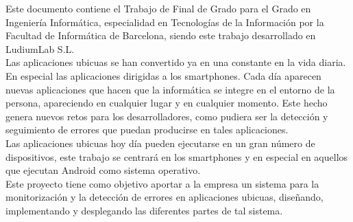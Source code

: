 
\renewenvironment{abstract}
{\small
	\begin{center}
		\bfseries \abstractname\vspace{-.5em}\vspace{0pt}
	\end{center}
	\list{}{%
		\setlength{\leftmargin}{5mm}%
		\setlength{\rightmargin}{\leftmargin}%
	}%
	\item\relax}
{\endlist}

\begin{abstract}
	
	Este documento contiene el Trabajo de Final de Grado para el Grado en Ingeniería Informática, especialidad en Tecnologías de la Información por la Facultad de Informática de Barcelona, siendo este trabajo desarrollado en LudiumLab S.L.		
	\\
	Las aplicaciones ubicuas se han convertido ya en una constante en la vida diaria. En especial las aplicaciones dirigidas a los smartphones. Cada día aparecen nuevas aplicaciones que hacen que la informática se integre en el entorno de la persona, apareciendo en cualquier lugar y en cualquier momento. Este hecho genera nuevos retos para los desarrolladores, como pudiera ser la detección y seguimiento de errores que puedan producirse en tales aplicaciones. 
	\\
	Las aplicaciones ubicuas hoy día pueden ejecutarse en un gran número de dispositivos, este trabajo se centrará en los smartphones y en especial en aquellos que ejecutan Android como sistema operativo.
	\\
	Este proyecto tiene como objetivo aportar a la empresa un sistema para la monitorización y la detección de errores en aplicaciones ubicuas, diseñando, implementando y desplegando las diferentes partes de tal sistema.
		
\end{abstract}